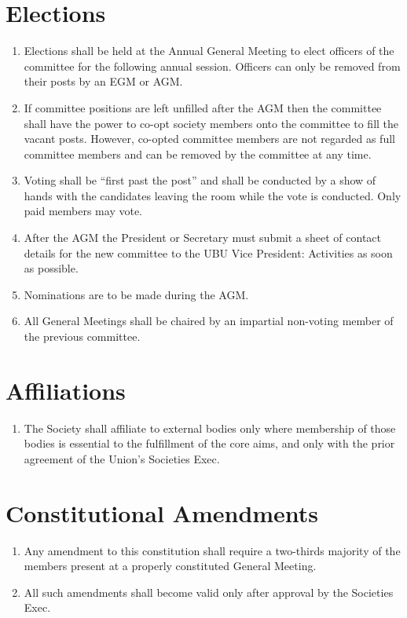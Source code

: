 \documentclass[a4paper,10pt]{article}
\begin{document}
\section{Elections}
\begin{enumerate}
  \item Elections shall be held at the Annual General Meeting to elect officers of the committee for the following annual session. Officers can only be removed from their posts by an EGM or AGM.
  \item If committee positions are left unfilled after the AGM then the committee shall have the power to co-opt society members onto the committee to fill the vacant posts. However, co-opted committee members are not regarded as full committee members and can be removed by the committee at any time.
  \item Voting shall be “first past the post” and shall be conducted by a show of hands with the candidates leaving the room while the vote is conducted. Only paid members may vote.
  \item After the AGM the President or Secretary must submit a sheet of contact details for the new committee to the UBU Vice President: Activities as soon as possible.
  \item Nominations are to be made during the AGM.
  \item All General Meetings shall be chaired by an impartial non-voting member of the previous committee.
\end{enumerate}

\section{Affiliations}
\begin{enumerate}
  \item The Society shall affiliate to external bodies only where membership of those bodies is essential to the fulfillment of the core aims, and only with the prior agreement of the Union's Societies Exec.
\end{enumerate}

\section{Constitutional Amendments}
\begin{enumerate}
  \item Any amendment to this constitution shall require a two-thirds majority of the members present at a properly constituted General Meeting.
  \item All such amendments shall become valid only after approval by the Societies Exec.
\end{enumerate}
\end{document}
